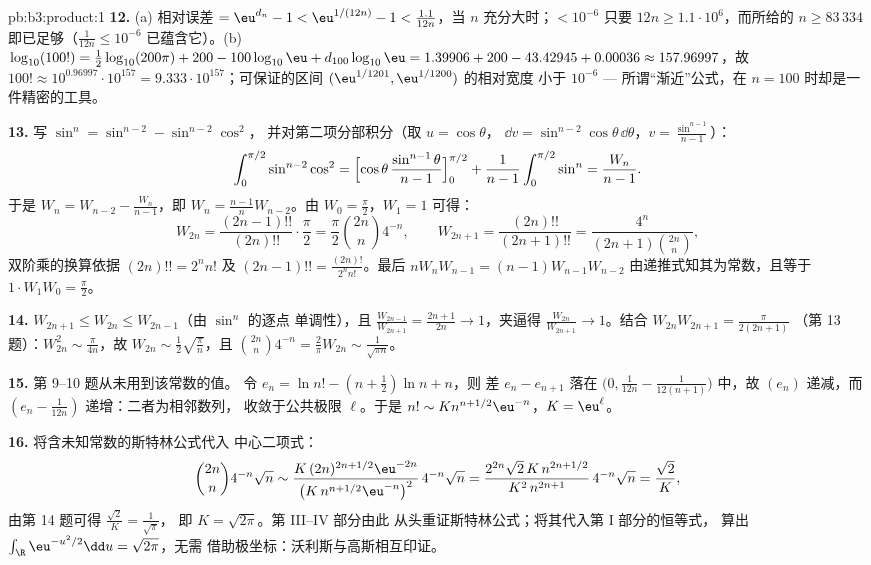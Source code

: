 \begin{solution}{pb:b3:product:1}
\textbf{12.} (a) 相对误差 $= \eu^{d_n} - 1 <
\eu^{1/(12n)} - 1 < \frac{1.1}{12n}$，当 $n$ 充分大时；$<
10^{-6}$ 只要 $12n \geq 1.1\cdot10^6$，而所给的
$n \geq 83\,334$ 即已足够（$\frac1{12n} \leq 10^{-6}$
已蕴含它）。(b) $\log_{10}(100!) =
\frac12\log_{10}(200\pi) + 200 - 100\log_{10}\eu +
d_{100}\log_{10}\eu = 1.39906 + 200 - 43.42945 + 0.00036
\approx 157.96997$，故 $100! \approx 10^{0.96997} \cdot
10^{157} = 9.333\cdot10^{157}$；可保证的区间
$(\eu^{1/1201}, \eu^{1/1200})$ 的相对宽度
小于 $10^{-6}$ --- 所谓“渐近”公式，在 $n =
100$ 时却是一件精密的工具。

\textbf{13.} 写 $\sin^n = \sin^{n-2} - \sin^{n-2}\cos^2$，
并对第二项分部积分（取 $u = \cos\theta$，
$\dd v = \sin^{n-2}\cos\theta\,\dd\theta$，$v =
\frac{\sin^{n-1}}{n-1}$）：
\[
\int_0^{\pi/2}\sin^{n-2}\cos^2 =
\Bigl[\cos\theta\,\frac{\sin^{n-1}\theta}{n-1}\Bigr]_0^{\pi/2}
+ \frac1{n-1}\int_0^{\pi/2}\sin^n = \frac{W_n}{n-1} .
\]
于是 $W_n = W_{n-2} - \frac{W_n}{n-1}$，即 $W_n =
\frac{n-1}nW_{n-2}$。由 $W_0 = \frac\pi2$，$W_1 = 1$ 可得：
\[
W_{2n} = \frac{(2n-1)!!}{(2n)!!}\cdot\frac\pi2
= \frac\pi2\binom{2n}n4^{-n},
\qquad
W_{2n+1} = \frac{(2n)!!}{(2n+1)!!}
= \frac{4^n}{(2n+1)\binom{2n}n},
\]
双阶乘的换算依据 $(2n)!! = 2^nn!$ 及
$(2n-1)!! = \frac{(2n)!}{2^nn!}$。最后 $nW_nW_{n-1} =
(n-1)W_{n-1}W_{n-2}$ 由递推式知其为常数，且等于
$1\cdot W_1W_0 = \frac\pi2$。

\textbf{14.} $W_{2n+1} \leq W_{2n} \leq W_{2n-1}$（由 $\sin^n$ 的逐点
单调性），且 $\frac{W_{2n-1}}{W_{2n+1}} =
\frac{2n+1}{2n} \to 1$，夹逼得 $\frac{W_{2n}}{W_{2n+1}} \to
1$。结合 $W_{2n}W_{2n+1} = \frac{\pi}{2(2n+1)}$
（第 13 题）：$W_{2n}^2 \sim \frac\pi{4n}$，故 $W_{2n} \sim
\frac12\sqrt{\frac\pi n}$，且 $\binom{2n}n4^{-n} =
\frac2\pi W_{2n} \sim \frac1{\sqrt{\pi n}}$。

\textbf{15.} 第 9--10 题从未用到该常数的值。
令 $e_n = \ln n! - (n+\frac12)\ln n + n$，则
差 $e_n - e_{n+1}$ 落在 $\bigl(0, \frac1{12n} -
\frac1{12(n+1)}\bigr)$ 中，故 $(e_n)$ 递减，而 $(e_n -
\frac1{12n})$ 递增：二者为相邻数列，
收敛于公共极限 $\ell$。于是 $n! \sim K n^{n+1/2}\eu^{-n}$，$K =
\eu^\ell$。

\textbf{16.} 将含未知常数的斯特林公式代入
中心二项式：
\[
\binom{2n}n4^{-n}\sqrt n \sim
\frac{K\,(2n)^{2n+1/2}\eu^{-2n}}{\bigl(K\,n^{n+1/2}
\eu^{-n}\bigr)^2}\,4^{-n}\sqrt n
= \frac{2^{2n}\sqrt{2}\,K\,n^{2n+1/2}}{K^2\,n^{2n+1}}
\,4^{-n}\sqrt n = \frac{\sqrt2}{K},
\]
由第 14 题可得 $\frac{\sqrt2}K = \frac1{\sqrt\pi}$，
即 $K = \sqrt{2\pi}$。第 III--IV 部分由此
从头重证斯特林公式；将其代入第 I 部分的恒等式，
算出 $\int_\R\eu^{-u^2/2}\dd u = \sqrt{2\pi}$，无需
借助极坐标：沃利斯与高斯相互印证。


\end{solution}
